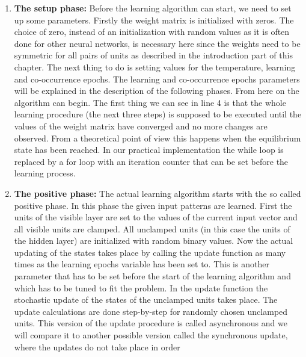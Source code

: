 \documentclass[12pt,twoside]{article}
\theoremstyle{plain}
\theoremstyle{definition}
\theoremstyle{remark}
\begin{document}
\begin{enumerate}
    \item \textbf{The setup phase:}\newline
        Before the learning algorithm can start, we need to set up some parameters. Firstly the weight matrix is initialized with zeros.
        The choice of zero, instead of an initialization with random values as it is often done for other neural networks, is
        necessary here since the weights need to be symmetric for all pairs of units as described in the introduction part of this chapter.
        The next thing to do is setting values for the temperature, learning and co-occurrence epochs. 
        The learning and co-occurrence epochs parameters will be explained in the description of the following phases.\newline
        From here on the algorithm can begin. The first thing we can see in line 4 is that the whole learning procedure (the next three steps) is
        supposed to be executed until the values of the weight matrix have converged and no more changes are observed.
        From a theoretical point of view this happens when the equilibrium state has been reached.
        In our practical implementation the while loop is replaced by a for loop with an iteration counter that can be set before the learning process.
    \item \textbf{The positive phase:}\newline
        The actual learning algorithm starts with the so called positive phase. In this phase the given input patterns are learned.
        First the units of the visible layer are set to the values of the current input vector and all visible units are clamped.
        All unclamped units (in this case the units of the hidden layer) are initialized with random binary values.
        Now the actual updating of the states takes place by calling the update function as many times as the learning epochs variable has been set to.
        This is another parameter that has to be set before the start of the learning algorithm and which has to be tuned to fit the problem.\newline
        In the update function the stochastic update of the states of the unclamped units takes place. The update calculations are done
        step-by-step for randomly chosen unclamped units. This version of the update procedure is called asynchronous and we will
        compare it to another possible version called the synchronous update, where the updates do not take place in order

\end{enumerate}
\end{document}
